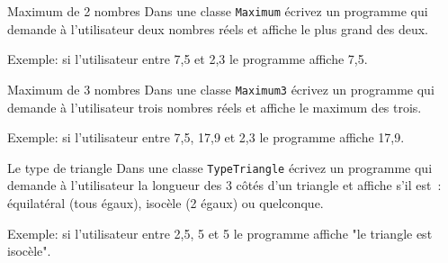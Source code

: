 \documentclass[a4paper,11pt]{article}
\begin{document}
	\begin{Exercice}{Maximum de 2 nombres}
		Dans une classe \texttt{Maximum} écrivez un programme qui demande à l'utilisateur deux nombres réels
		et affiche le plus grand des deux.
		
		Exemple: si l'utilisateur entre 7,5 et 2,3 le programme affiche 7,5. 
	\end{Exercice}
	
	\begin{Exercice}{Maximum de 3 nombres}
		Dans une classe \texttt{Maximum3} écrivez un programme qui demande à l'utilisateur 
		trois nombres réels et affiche le maximum des trois.
		
		Exemple: si l'utilisateur entre 7,5, 17,9 et 2,3 le programme affiche 17,9. 
	\end{Exercice}

	\begin{Exercice}{Le type de triangle}
 		Dans une classe \texttt{TypeTriangle} écrivez un programme qui demande à l'utilisateur 
		 la longueur des 3 côtés d'un triangle et affiche s'il est~: 
		 équilatéral (tous égaux), isocèle (2 égaux) ou quelconque.
		 
		 Exemple: si l'utilisateur entre 2,5, 5 et 5 le programme affiche "le triangle est isocèle". 
	\end{Exercice}
	
\end{document}
